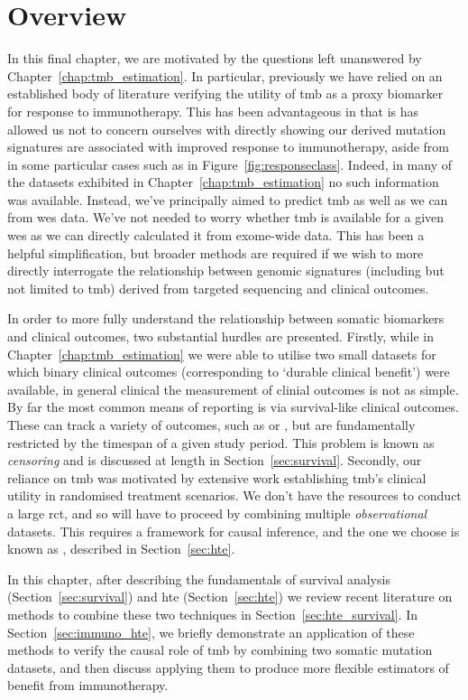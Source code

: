 \documentclass[../thesis.tex]{subfiles}
\begin{document}
\section{Overview}
In this final chapter, we are motivated by the questions left unanswered by Chapter~\ref{chap:tmb_estimation}. In particular, previously we have relied on an established body of literature verifying the utility of \gls{tmb} as a proxy biomarker for response to immunotherapy. This has been advantageous in that is has allowed us not to concern ourselves with directly showing our derived mutation signatures are associated with improved response to immunotherapy, aside from in some particular cases such as in Figure~\ref{fig:responseclass}. Indeed, in many of the datasets exhibited in Chapter~\ref{chap:tmb_estimation} no such information was available. Instead, we've principally aimed to predict \gls{tmb} as well as we can from \gls{wes} data. We've not needed to worry whether \gls{tmb} is available for a given \gls{wes} as we can directly calculated it from exome-wide data.  This has been a helpful simplification, but broader methods are required if we wish to more directly interrogate the relationship between genomic signatures (including but not limited to \gls{tmb}) derived from targeted sequencing and clinical outcomes. 

In order to more fully understand the relationship between somatic biomarkers and clinical outcomes, two substantial hurdles are presented. Firstly, while in Chapter~\ref{chap:tmb_estimation} we were able to utilise two small datasets for which binary clinical outcomes (corresponding to `durable clinical benefit') were available, in general clinical the measurement of clinial outcomes is not as simple. By far the most common means of reporting is via survival-like clinical outcomes. These can track a variety of outcomes, such as  or , but are fundamentally restricted by the timespan of a given study period. This problem is known as \textit{censoring} and is discussed at length in Section~\ref{sec:survival}. Secondly, our reliance on \gls{tmb} was motivated by extensive work establishing \gls{tmb}'s clinical utility in randomised treatment scenarios. We don't have the resources to conduct a large \gls{rct}, and so will have to proceed by combining multiple \emph{observational} datasets. This requires a framework for causal inference, and the one we choose is known as , described in Section~\ref{sec:hte}.

In this chapter, after describing the fundamentals of survival analysis (Section~\ref{sec:survival}) and \gls{hte} (Section~\ref{sec:hte}) we review recent literature on methods to combine these two techniques in Section~\ref{sec:hte_survival}. In Section~\ref{sec:immuno_hte}, we briefly demonstrate an application of these methods to verify the causal role of \gls{tmb} by combining two somatic mutation datasets, and then discuss applying them to produce more flexible estimators of benefit from immunotherapy.
\end{document}
